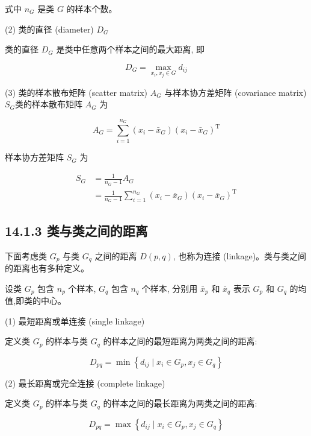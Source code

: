 \documentclass[10pt]{article}
\begin{document}
式中 $n_{G}$ 是类 $G$ 的样本个数。

(2) 类的直径 (diameter) $D_{G}$

类的直径 $D_{G}$ 是类中任意两个样本之间的最大距离, 即


\begin{equation*}
D_{G}=\max _{x_{i}, x_{j} \in G} d_{i j} \tag{14.11}
\end{equation*}


(3) 类的样本散布矩阵 (scatter matrix) $A_{G}$ 与样本协方差矩阵 (covariance matrix) $S_{G}$类的样本散布矩阵 $A_{G}$ 为


\begin{equation*}
A_{G}=\sum_{i=1}^{n_{G}}\left(x_{i}-\bar{x}_{G}\right)\left(x_{i}-\bar{x}_{G}\right)^{\mathrm{T}} \tag{14.12}
\end{equation*}


样本协方差矩阵 $S_{G}$ 为


\begin{align*}
S_{G} & =\frac{1}{n_{G}-1} A_{G} \\
& =\frac{1}{n_{G}-1} \sum_{i=1}^{n_{G}}\left(x_{i}-\bar{x}_{G}\right)\left(x_{i}-\bar{x}_{G}\right)^{\mathrm{T}} \tag{14.13}
\end{align*}


\subsection*{14.1.3 类与类之间的距离}
下面考虑类 $G_{p}$ 与类 $G_{q}$ 之间的距离 $D(p, q)$, 也称为连接 (linkage)。类与类之间的距离也有多种定义。

设类 $G_{p}$ 包含 $n_{p}$ 个样本, $G_{q}$ 包含 $n_{q}$ 个样本, 分别用 $\bar{x}_{p}$ 和 $\bar{x}_{q}$ 表示 $G_{p}$ 和 $G_{q}$ 的均值,即类的中心。

(1) 最短距离或单连接 (single linkage)

定义类 $G_{p}$ 的样本与类 $G_{q}$ 的样本之间的最短距离为两类之间的距离:


\begin{equation*}
D_{p q}=\min \left\{d_{i j} \mid x_{i} \in G_{p}, x_{j} \in G_{q}\right\} \tag{14.14}
\end{equation*}


(2) 最长距离或完全连接 (complete linkage)

定义类 $G_{p}$ 的样本与类 $G_{q}$ 的样本之间的最长距离为两类之间的距离:


\begin{equation*}
D_{p q}=\max \left\{d_{i j} \mid x_{i} \in G_{p}, x_{j} \in G_{q}\right\} \tag{14.15}
\end{equation*}
\end{document}
